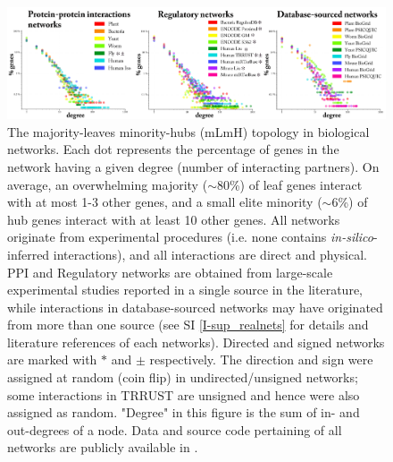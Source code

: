 \documentclass[12pt]{article}
\begin{document}
\vspace{.1cm}
\begin{figure}[H]%
        \includegraphics[width=\textwidth]{Figure1.png}
        \caption{The majority-leaves minority-hubs (mLmH) topology in biological networks. Each dot represents the percentage of genes in the network having a given degree (number of interacting partners).  On average, an overwhelming majority (${\sim}$80\%) of leaf genes interact with at most 1-3 other genes, and a small elite minority (${\sim}$6\%) of hub genes interact with at least 10 other genes. All networks originate from experimental procedures (i.e. none contains \textit{in-silico}-inferred interactions), and all interactions are direct and physical. PPI and Regulatory networks are obtained from large-scale experimental studies reported in a single source in the literature, while interactions in database-sourced networks may have originated from more than one source (see SI \ref{I-sup_realnets} for details and literature references of each networks). Directed and signed networks are marked with $*$ and $\pm$ respectively. The direction and sign were assigned at random (coin flip) in undirected/unsigned networks; some interactions in TRRUST are unsigned and hence were also assigned as random. "Degree" in this figure is the sum of in- and out-degrees of a node. Data and source code pertaining of all networks are publicly available in  \cite{atiia_case-study_2017}.
        }
        \label{mLmH_fig}
\end{figure}
\end{document}
